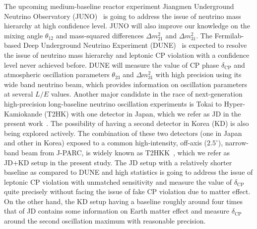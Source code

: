 \documentclass[11pt,a4paper]{article}
\begin{document}
The upcoming medium-baseline reactor experiment Jiangmen Underground Neutrino Observatory (JUNO)~\cite{JUNO:2015zny,JUNO:2021vlw} is going to address the issue of neutrino mass hierarchy at high confidence level. JUNO will also improve our knowledge on the mixing angle $\theta_{12}$ and mass-squared differences $\Delta m^2_{21}$ and $\Delta m^2_{31}$.
The Fermilab-based Deep Underground Neutrino Experiment (DUNE)~\cite{DUNE:2020lwj,DUNE:2020jqi,DUNE:2021cuw,DUNE:2021mtg} is expected to resolve the issue of neutrino mass hierarchy and leptonic CP violation with a confidence level never achieved before. DUNE will measure the value of CP phase $\delta_{\mathrm{CP}}$ and atmospheric oscillation parameters $\theta_{23}$ and $\Delta m^2_{31}$ with high precision using its wide band neutrino beam, which provides information on oscillation parameters at several $L/E$ values.
Another major candidate in the race of next-generation high-precision long-baseline neutrino oscillation experiments is Tokai to Hyper-Kamiokande (T2HK) with one detector in Japan, which we refer as JD in the present work~\cite{Hyper-KamiokandeProto-:2015xww, Hyper-Kamiokande:2018ofw}. The possibility of having a second detector in Korea (KD) is also being explored actively. The combination of these two detectors (one in Japan and other in Korea) exposed to a common high-intensity, off-axis ($2.5^{\circ}$), narrow-band beam from J-PARC, is widely known as T2HKK~\cite{Hyper-Kamiokande:2016srs}, which we refer as JD+KD setup in the present study.
The JD setup with a relatively shorter baseline as compared to DUNE and high statistics is going to address the issue of leptonic CP violation with unmatched sensitivity and measure the value of $\delta_{\mathrm{CP}}$ quite precisely without facing the issue of fake CP violation due to matter effect. On the other hand, the KD setup having a baseline roughly around four times that of JD contains some information on Earth matter effect and measure $\delta_{\mathrm{CP}}$ around the second oscillation maximum with reasonable precision.
\end{document}
